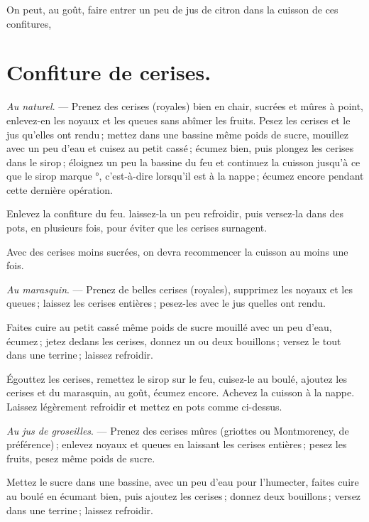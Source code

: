 On peut, au goût, faire entrer un peu de jus de citron dans la cuisson de ces
confitures,

\section*{\centering Confiture de cerises.}
{}

\textit{Au naturel}. — Prenez des cerises (royales) bien en chair, sucrées et
mûres à point, enlevez-en les noyaux et les queues sans abîmer les fruits.
Pesez les cerises et le jus qu'elles ont rendu ; mettez dans une bassine même
poids de sucre, mouillez avec un peu d'eau et cuisez au petit cassé ; écumez
bien, puis plongez les cerises dans le sirop ; éloignez un peu la bassine du
feu et continuez la cuisson jusqu'à ce que le sirop marque {\mmm}°,
c'est-à-dire lorsqu'il est à la nappe ; écumez encore pendant cette dernière
opération.

Enlevez la confiture du feu. laissez-la un peu refroidir, puis versez-la dans
des pots, en plusieurs fois, pour éviter que les cerises surnagent.

Avec des cerises moins sucrées, on devra recommencer la cuisson au moins une
fois.

\sk

\textit{Au marasquin}. — Prenez de belles cerises (royales), supprimez les
noyaux et les queues ; laissez les cerises entières ; pesez-les avec le jus
quelles ont rendu.

Faites cuire au petit cassé même poids de sucre mouillé avec un peu d'eau,
écumez ; jetez dedans les cerises, donnez un ou deux bouillons ; versez le tout
dans une terrine ; laissez refroidir.

Égouttez les cerises, remettez le sirop sur le feu, cuisez-le au boulé, ajoutez
les cerises et du marasquin, au goût, écumez encore. Achevez la cuisson à la
nappe. Laissez légèrement refroidir et mettez en pots comme ci-dessus.

\sk

\textit{Au jus de groseilles}. — Prenez des cerises mûres (griottes ou
Montmorency, de préférence) ; enlevez noyaux et queues en laissant les cerises
entières ; pesez les fruits, pesez même poids de sucre.

Mettez le sucre dans une bassine, avec un peu d'eau pour l'humecter, faites
cuire au boulé en écumant bien, puis ajoutez les cerises ; donnez deux
bouillons ; versez dans une terrine ; laissez refroidir.

